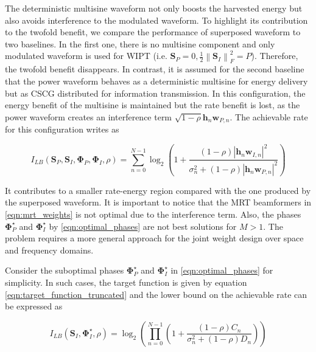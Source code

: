 The deterministic multisine waveform not only boosts the harvested energy but also avoids interference to the modulated waveform. To highlight its contribution to the twofold benefit, we compare the performance of superposed waveform to two baselines. In the first one, there is no multisine component and only modulated waveform is used for WIPT (i.e. ${{\mathbf{S}}_P} = 0,\frac{1}{2}\left\| {{{\mathbf{S}}_I}} \right\|_F^2 = P$). Therefore, the twofold benefit disappears. In contrast, it is assumed for the second baseline that the power waveform behaves as a deterministic multisine for energy delivery but as CSCG distributed for information transmission. In this configuration, the energy benefit of the multisine is maintained but the rate benefit is lost, as the power waveform creates an interference term $\sqrt {1 - \rho } {{\mathbf{h}}_n}{{\mathbf{w}}_{P,n}}$. The achievable rate for this configuration writes as

\begin{equation}\label{eqn:mutual_information_lower_bound}
  {I_{LB}}\left( {{{\mathbf{S}}_P},{{\mathbf{S}}_I},{{\mathbf{\Phi }}_P},{{\mathbf{\Phi }}_I},\rho } \right) = \sum\limits_{n = 0}^{N - 1} {{{\log }_2}} \left( {1 + \frac{{(1 - \rho ){{\left| {{{\mathbf{h}}_n}{{\mathbf{w}}_{I,n}}} \right|}^2}}}{{\sigma _n^2 + (1 - \rho ){{\left| {{{\mathbf{h}}_n}{{\mathbf{w}}_{P,n}}} \right|}^2}}}} \right)
\end{equation}

It contributes to a smaller rate-energy region compared with the one produced by the superposed waveform. It is important to notice that the MRT beamformers in \ref{eqn:mrt_weights} is not optimal due to the interference term. Also, the phases ${\mathbf{\Phi }}_P^ \star $ and ${\mathbf{\Phi }}_I^ \star $ by \ref{eqn:optimal_phases} are not best solutions for $M > 1$. The problem requires a more general approach for the joint weight design over space and frequency domains.

Consider the suboptimal phases ${\mathbf{\Phi }}_P^ \star $ and ${\mathbf{\Phi }}_I^ \star $ in \ref{eqn:optimal_phases} for simplicity. In such cases, the target function is given by equation \ref{eqn:target_function_truncated} and the lower bound on the achievable rate can be expressed as

\begin{equation}\label{mutual_information_lower_bound_rewritten}
  {I_{LB}}\left( {{{\mathbf{S}}_I},{\mathbf{\Phi }}_I^ \star ,\rho } \right) = {\log _2}\left( {\prod\limits_{n = 0}^{N - 1} {\left( {1 + \frac{{(1 - \rho ){C_n}}}{{\sigma _n^2 + (1 - \rho ){D_n}}}} \right)} } \right)
\end{equation}

